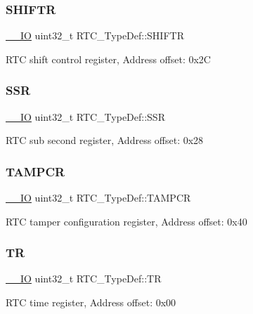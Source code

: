 \subsubsection{\texorpdfstring{SHIFTR}{SHIFTR}}
{\footnotesize\ttfamily \mbox{\hyperlink{core__sc300_8h_aec43007d9998a0a0e01faede4133d6be}{\+\_\+\+\_\+\+IO}} uint32\+\_\+t R\+T\+C\+\_\+\+Type\+Def\+::\+S\+H\+I\+F\+TR}

R\+TC shift control register, Address offset\+: 0x2C \mbox{\label{struct_r_t_c___type_def_aefbd38be87117d1fced289bf9c534414}} 
\subsubsection{\texorpdfstring{SSR}{SSR}}
{\footnotesize\ttfamily \mbox{\hyperlink{core__sc300_8h_aec43007d9998a0a0e01faede4133d6be}{\+\_\+\+\_\+\+IO}} uint32\+\_\+t R\+T\+C\+\_\+\+Type\+Def\+::\+S\+SR}

R\+TC sub second register, Address offset\+: 0x28 \mbox{\label{struct_r_t_c___type_def_ac0647909891aa2c3abd2bc54300ceb9b}} 
\subsubsection{\texorpdfstring{TAMPCR}{TAMPCR}}
{\footnotesize\ttfamily \mbox{\hyperlink{core__sc300_8h_aec43007d9998a0a0e01faede4133d6be}{\+\_\+\+\_\+\+IO}} uint32\+\_\+t R\+T\+C\+\_\+\+Type\+Def\+::\+T\+A\+M\+P\+CR}

R\+TC tamper configuration register, Address offset\+: 0x40 \mbox{\label{struct_r_t_c___type_def_a2e8783857f8644a4eb80ebc51e1cba42}} 
\subsubsection{\texorpdfstring{TR}{TR}}
{\footnotesize\ttfamily \mbox{\hyperlink{core__sc300_8h_aec43007d9998a0a0e01faede4133d6be}{\+\_\+\+\_\+\+IO}} uint32\+\_\+t R\+T\+C\+\_\+\+Type\+Def\+::\+TR}

R\+TC time register, Address offset\+: 0x00 \mbox{\label{struct_r_t_c___type_def_aa4633dbcdb5dd41a714020903fd67c82}} 
